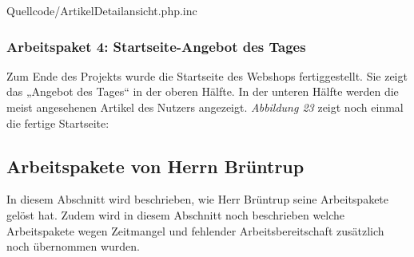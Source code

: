 \begin{center}
	\begin{lstinputlisting}[language=PHP, caption={Auszug aus der Seite Artikel Detailansicht}]
		{Quellcode/ArtikelDetailansicht.php.inc}
	\end{lstinputlisting}
\end{center}


\subsubsection{Arbeitspaket 4: Startseite-Angebot des Tages}

Zum Ende des Projekts wurde die Startseite des Webshops fertiggestellt. Sie zeigt das „Angebot des Tages“ in der oberen Hälfte. In der unteren Hälfte werden die meist angesehenen Artikel des Nutzers angezeigt. \textit{Abbildung 23} zeigt noch einmal die fertige Startseite:

\begin{figure}[H]
\begin{center}
\end{center}
\caption{\grqq{}}
\end{figure}


\newpage
\subsection{Arbeitspakete von Herrn Brüntrup}
In diesem Abschnitt wird beschrieben, wie Herr Brüntrup seine Arbeitspakete gelöst hat. Zudem wird in diesem Abschnitt noch beschrieben welche Arbeitspakete wegen Zeitmangel und fehlender Arbeitsbereitschaft zusätzlich noch übernommen wurden.


